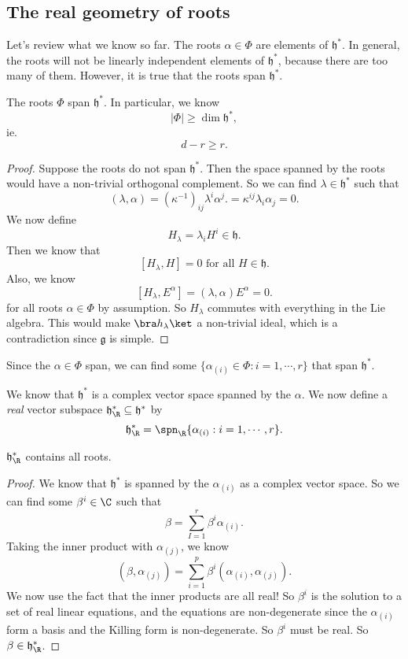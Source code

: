 \documentclass[a4paper]{article}
\begin{document}
\subsection{The real geometry of roots}
Let's review what we know so far. The roots $\alpha \in \Phi$ are elements of $\mathfrak{h}^*$. In general, the roots will not be linearly independent elements of $\mathfrak{h}^*$, because there are too many of them. However, it is true that the roots span $\mathfrak{h}^*$.

\begin{prop}
  The roots $\Phi$ span $\mathfrak{h}^*$. In particular, we know
  \[
    |\Phi| \geq \dim \mathfrak{h}^*,
  \]
  ie.
  \[
    d - r \geq r.
  \]
\end{prop}

\begin{proof}
  Suppose the roots do not span $\mathfrak{h}^*$. Then the space spanned by the roots would have a non-trivial orthogonal complement. So we can find $\lambda \in \mathfrak{h}^*$ such that
  \[
    (\lambda, \alpha) = (\kappa^{-1})_{ij} \lambda^i \alpha^j.= \kappa^{ij} \lambda_i \alpha_j = 0.
  \]
  We now define
  \[
    H_{\lambda} = \lambda_i H^i \in \mathfrak{h}.
  \]
  Then we know that
  \[
    [H_\lambda, H] = 0\text{ for all }H \in \mathfrak{h}.
  \]
  Also, we know
  \[
    [H_\lambda, E^\alpha] = (\lambda, \alpha) E^\alpha = 0.
  \]
  for all roots $\alpha \in \Phi$ by assumption. So $H_\lambda$ commutes with everything in the Lie algebra. This would make $\bra h_\lambda\ket$ a non-trivial ideal, which is a contradiction since $\mathfrak{g}$ is simple.
\end{proof}
Since the $\alpha \in \Phi$ span, we can find some $\{\alpha_{(i)} \in \Phi: i = 1, \cdots, r\}$ that span $\mathfrak{h}^*$.

We know that $\mathfrak{h}^*$ is a complex vector space spanned by the $\alpha$. We now define a \emph{real} vector subspace $\mathfrak{h}_\R^* \subseteq \mathfrak{h}^*$ by
\[
  \mathfrak{h}_\R^* = \spn_\R\{\alpha_{(i)}: i = 1, \cdots, r\}.
\]
\begin{prop}
  $\mathfrak{h}_\R^*$ contains all roots.
\end{prop}

\begin{proof}
  We know that $\mathfrak{h}^*$ is spanned by the $\alpha_{(i)}$ as a complex vector space. So we can find some $\beta^i \in \C$ such that
  \[
    \beta = \sum_{I = 1}^r \beta^i \alpha_{(i)}.
  \]
  Taking the inner product with $\alpha_{(j)}$, we know
  \[
    (\beta, \alpha_{(j)}) = \sum_{i = 1}^p \beta^i(\alpha_{(i)}, \alpha_{(j)}).
  \]
  We now use the fact that the inner products are all real! So $\beta^i$ is the solution to a set of real linear equations, and the equations are non-degenerate since the $\alpha_{(i)}$ form a basis and the Killing form is non-degenerate. So $\beta^i$ must be real. So $\beta \in \mathfrak{h}^*_\R$.
\end{proof}
\end{document}
